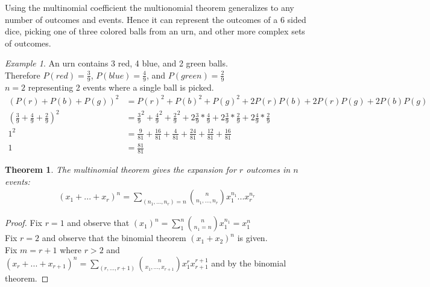 \documentclass{article}
\theoremstyle{plain}
\newtheorem{theorem}{Theorem}
\theoremstyle{definition}
\theoremstyle{remark}
\newtheorem{example}{Example}
\begin{document}
Using the multinomial coefficient the multionomial theorem generalizes to any number of outcomes and events. Hence it can represent the outcomes of a 6 sided dice, picking one of three colored balls from an urn, and other more complex sets of outcomes.
\begin{example}
  An urn contains 3 red, 4 blue, and 2 green balls. \\
  Therefore $P(red) = \frac{3}{9}$, $P(blue) = \frac{4}{9}$, and $P(green) = \frac{2}{9}$ \\
  $n = 2$ representing 2 events where a single ball is picked. \\
  \begin{align*}
    (P(r) + P(b) + P(g))^2 &= P(r)^2 + P(b)^2 + P(g)^2 + 2P(r)P(b) + 2P(r)P(g)+ 2P(b)P(g) \\
    (\frac{3}{9} + \frac{4}{9} + \frac{2}{9})^2 &= \frac{3}{9}^2 + \frac{4}{9}^2 + \frac{2}{9}^2 + 2\frac{3}{9}*\frac{4}{9} + 2\frac{3}{9}*\frac{2}{9} + 2\frac{4}{9}*\frac{2}{9} \\
    1^2 &= \frac{9}{81} + \frac{16}{81} + \frac{4}{81} + \frac{24}{81} + \frac{12}{81} + \frac{16}{81} \\
    1 &= \frac{81}{81}
  \end{align*}
\end{example}
\begin{theorem}
  The multinomial theorem gives the expansion for $r$ outcomes in $n$ events:
  \begin{align*}
    (x_1+...+x_r)^n = \sum_{(n_1,...,n_r) = n}\binom{n}{n_1,...,n_r}x_1^{n_1}...x_r^{n_r}
  \end{align*}
\end{theorem}
\begin{proof}
  Fix $r = 1$ and observe that $(x_1)^n=\sum_{1}^n\binom{n}{n_1 = n}x_1^{n_1} = x_1^n$ \\
  Fix $r = 2$ and observe that the binomial theorem $(x_1 + x_2)^n$ is given. \\
  Fix $m = r + 1$ where $r > 2$ and $(x_r + ... + x_{r+1})^n = \sum_{(r, ..., r+1)}\binom{n}{x_1,...,x_{r+1}}x_1^rx_{r+1}^{r+1}$  and by the binomial theorem.
\end{proof}
\end{document}
